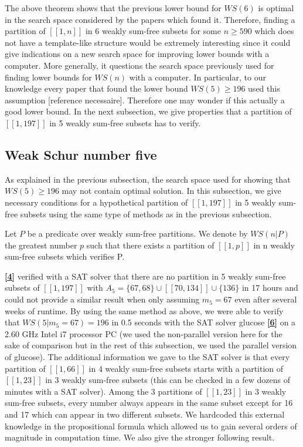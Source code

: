\par
The above theorem shows that the previous lower bound for \(WS(6)\) is optimal in the search space considered by the papers which found it.
Therefore, finding a partition of \([\![1,n]\!]\) in 6 weakly sum-free subsets for some \(n \geqslant 590\) which does not have a template-like structure
would be extremely interesting since it could give indications on a new search space for improving lower bounds with a computer. More generally,
it questions the search space previously used for finding lower bounds for \(WS(n)\) with a computer. In particular, to our knowledge every paper
that found the lower bound \(WS(5) \geqslant 196\) used this assumption [reference necessaire]. Therefore one may wonder if this actually a good lower
bound. In the next subsection, we give properties that a partition of \([\![1,197]\!]\) in 5 weakly sum-free subsets has to verify.


\subsection{Weak Schur number five}
As explained in the previous subsection, the search space used for showing that  \(WS(5) \geqslant 196\) may not contain optimal solution. In this subsection,
we give necessary conditions for a hypothetical partition of \([\![1,197]\!]\) in 5 weakly sum-free subsets using the same type of methods as in the 
previous subsection.

\begin{notation}
Let \(P\) be a predicate over weakly sum-free partitions. We denote by \(WS(n | P)\) the greatest number \(p\) such that there exists a partition of  
\([\![1,p]\!]\) in n weakly sum-free subsets which verifies P.
\end{notation}

\par
\hyperlink{label4}{\textbf{[4]}} verified with a SAT solver that there are no partition in 5 weakly sum-free subsets of \([\![1,197]\!]\) with
\(A_5 = \{67, 68\} \cup [\![70,134]\!] \cup \{136\}\) in 17 hours and could not provide a similar result when only assuming \(m_5 = 67\) even after several
weeks of runtime. By using the same method as above, we were able to verify that \(WS(5 | m_5 = 67) = 196\) in 0.5 seconds with the SAT solver glucose  \hyperlink{label6}{\textbf{[6]}}
on a 2.60 GHz Intel i7 processor PC (we used the non-parallel version here for the sake of comparison but in the rest of this subsection, we used the parallel version of glucose).
The additional information we gave to the SAT solver is that every partition of \([\![1,66]\!]\) in 4 weakly sum-free subsets starts with a partition of
\([\![1,23]\!]\) in 3 weakly sum-free subsets (this can be checked in a few dozens of minutes with a SAT solver). Among the 3 partitions of \([\![1,23]\!]\) in
3 weakly sum-free subsets, every number always appears in the same subset except for 16 and 17 which can appear in two different subsets. We hardcoded
this external knowledge in the propositional formula which allowed us to gain several orders of magnitude in computation time. We also give the stronger
following result.

